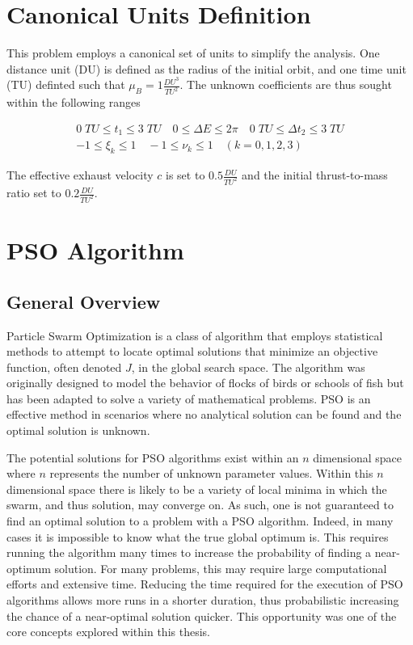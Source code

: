 \section{Canonical Units Definition}

This problem employs a canonical set of units to simplify the analysis. One distance unit (DU) is defined as the radius of the initial orbit,
and one time unit (TU) definted such that $\mu_B = 1 \frac{DU^3}{TU^2}$. The unknown coefficients are thus sought within the following ranges

\begin{gather}
0 \; TU \leq t_1 \leq 3 \; TU \quad 0 \leq \Delta E \leq 2\pi \quad 0 \; TU \leq \Delta t_2 \leq 3 \; TU \\
-1 \leq \xi_k \leq 1 \quad -1 \leq \nu_k \leq 1 \quad (k = 0,1,2,3)
\end{gather}

\noindent The effective exhaust velocity $c$ is set to $0.5 \frac{DU}{TU^2}$ and the initial thrust-to-mass ratio set to $0.2 \frac{DU}{TU^2}$. 

\section{PSO Algorithm}

\subsection{General Overview}
Particle Swarm Optimization is a class of algorithm that employs statistical methods to attempt to locate optimal solutions 
that minimize an objective function, often denoted $J$, in the global search space. The algorithm was originally designed to model
the behavior of flocks of birds or schools of fish but has been adapted to solve a variety of mathematical problems. PSO is an effective method in scenarios where no analytical solution can be found and the optimal solution is unknown. \newline

The potential solutions for PSO algorithms exist within an $n$ dimensional space where $n$ represents the number of unknown parameter values. Within this $n$ dimensional space there is likely to 
be a variety of local minima in which the swarm, and thus solution, may converge on. As such, one is not guaranteed to find an optimal solution to a problem with a PSO algorithm. Indeed, in many
cases it is impossible to know what the true global optimum is. This requires running the algorithm many times to increase the probability of finding a near-optimum solution. 
For many problems, this may require large computational efforts and extensive time. Reducing the time required for the execution of PSO algorithms allows more runs in a shorter duration,
thus probabilistic increasing the chance of a near-optimal solution quicker. This opportunity was one of the core concepts explored within this thesis.  \newline

